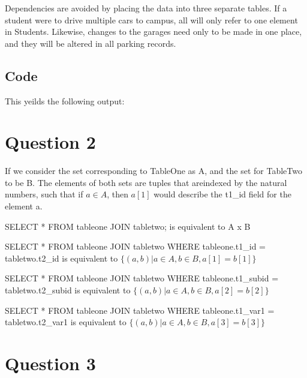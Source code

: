 \documentclass[10pt, letterpaper]{paper}
\begin{document}
Dependencies are avoided by placing the data into three separate tables. If a student were to drive multiple cars to campus, all will only refer to one element in Students. Likewise, changes to the garages need only to be made in one place, and they will be altered in all parking records.


\subsection*{Code}


This yeilds the following output:
\newline




\section*{Question 2}

If we consider the set corresponding to TableOne as A, and the set for TableTwo to be B. The elements of both sets are tuples that areindexed by the natural numbers, such that if $a \in A$, then $a[1]$ would describe the t1\_id field for the element a.
\newline

SELECT * FROM tableone JOIN tabletwo; is equivalent to A x B
\newline


SELECT * FROM tableone JOIN tabletwo WHERE tableone.t1\_id = tabletwo.t2\_id is equivalent to $\{ (a,b) | a \in A, b \in B, a[1] = b[1]\}$
 \newline
 
SELECT * FROM tableone JOIN tabletwo WHERE tableone.t1\_subid = tabletwo.t2\_subid is equivalent to $\{ (a,b) | a \in A, b \in B, a[2] = b[2]\}$
 \newline
 
SELECT * FROM tableone JOIN tabletwo WHERE tableone.t1\_var1 = tabletwo.t2\_var1 is equivalent to $\{ (a,b) | a \in A, b \in B, a[3] = b[3]\}$
 


\section*{Question 3}
\end{document}
